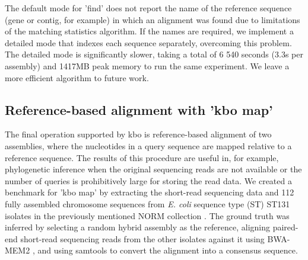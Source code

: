 \documentclass[unnumsec,webpdf,contemporary,large]{oup-authoring-template}%
\theoremstyle{thmstyleone}%
\theoremstyle{thmstyletwo}%
\theoremstyle{thmstylethree}%
\begin{document}
The default mode for 'find' does not report the name of the reference sequence (gene or contig, for example) in which an alignment was found due to limitations of the matching statistics algorithm. If the names are required, we implement a detailed mode that indexes each sequence separately, overcoming this problem. The detailed mode is significantly slower, taking a total of 6 540 seconds (3.3s per assembly) and 1417MB peak memory to run the same experiment. We leave a more efficient algorithm to future work.

\subsection{Reference-based alignment with 'kbo map'}

The final operation supported by {\sf kbo} is reference-based alignment of two assemblies, where the nucleotides in a query sequence are mapped relative to a reference sequence. The results of this procedure are useful in, for example, phylogenetic inference when the original sequencing reads are not available or the number of queries is prohibitively large for storing the read data. We created a benchmark for 'kbo map' by extracting the short-read sequencing data and 112 fully assembled chromosome sequences from \textit{E. coli} sequence type (ST) ST131 isolates in the previously mentioned NORM collection \cite{gladstone2021emergence,arredondo2023escherichia}. The ground truth was inferred by selecting a random hybrid assembly as the reference, aligning paired-end short-read sequencing reads from the other isolates against it using BWA-MEM2 \cite{vasimuddin2019efficient}, and using samtools \cite{10.1093/gigascience/giab008} to convert the alignment into a consensus sequence.
\end{document}
